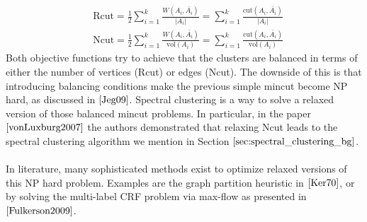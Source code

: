 \begin{equation}
\begin{aligned}
&\text{Rcut} = \frac{1}{2} \sum_{i=1}^k \frac{W(A_i, \bar{A_i})}{\left| A_i\right|} = \sum_{i=1}^k \frac{\text{cut}(A_i, \bar{A_i})}{\left| A_i\right|} \\
&\text{Ncut} = \frac{1}{2} \sum_{i=1}^k \frac{W(A_i, \bar{A_i})}{\text{vol}(A_i)} = \sum_{i=1}^k \frac{\text{cut}(A_i, \bar{A_i})}{\text{vol}(A_i)}
\end{aligned}
\end{equation}
Both objective functions try to achieve that the clusters are balanced in terms of either the number of vertices (Rcut) or edges (Ncut). The downside of this is that introducing balancing conditions make the previous simple mincut become NP hard, as discussed in $\cite{Jeg09}$. Spectral clustering is a way to solve a relaxed version of those balanced mincut problems. In particular, in the paper $\cite{vonLuxburg2007}$ the authors demonstrated that relaxing Ncut leads to the spectral clustering algorithm we mention in Section $\ref{sec:spectral_clustering_bg}$. \\ \\
In literature, many sophisticated methods exist to optimize relaxed versions of this NP hard problem. Examples are the graph partition heuristic in $\cite{Ker70}$, or by solving the multi-label CRF problem via max-flow as presented in $\cite{Fulkerson2009}$.

